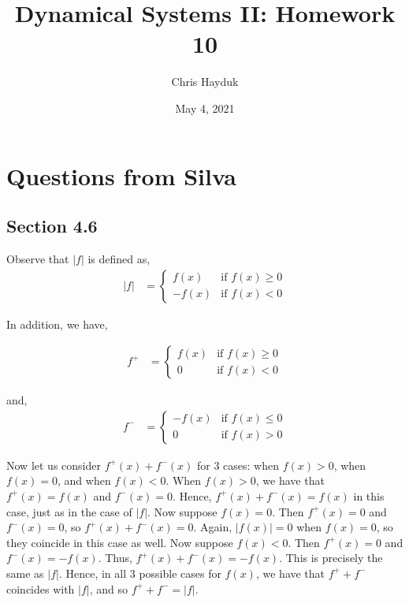 \documentclass[12pt]{article}
\newenvironment{problem}[2][Problem]{\begin{trivlist}
\item[\hskip \labelsep {\bfseries #1}\hskip \labelsep {\bfseries #2.}]}{\end{trivlist}}
\begin{document}
\title{Dynamical Systems II: Homework 10}

\author{Chris Hayduk}
\date{May 4, 2021}

\maketitle

\section{Questions from Silva}

\subsection{Section 4.6}

\begin{problem}{2}
\end{problem}

Observe that $|f|$ is defined as,
\begin{align*}
|f| &= \begin{cases}
f(x) & \text{if } f(x) \geq 0\\
-f(x) & \text{if } f(x) < 0
\end{cases}
\end{align*}

In addition, we have,

\begin{align*}
f^+ &= \begin{cases}
f(x) & \text{if } f(x) \geq 0\\
0 & \text{if } f(x) < 0
\end{cases}
\end{align*}

and,
\begin{align*}
f^- &= \begin{cases}
-f(x) & \text{if } f(x) \leq 0\\
0 & \text{if } f(x) > 0
\end{cases}
\end{align*}

Now let us consider $f^+(x) + f^-(x)$ for 3 cases: when $f(x) > 0$, when $f(x) = 0$, and when $f(x) < 0$. When $f(x) > 0$, we have that $f^+(x) = f(x)$ and $f^-(x) = 0$. Hence, $f^+(x) + f^-(x) = f(x)$ in this case, just as in the case of $|f|$. Now suppose $f(x) = 0$. Then $f^+(x) = 0$ and $f^-(x) = 0$, so $f^+(x) + f^-(x) = 0$. Again, $|f(x)| = 0$ when $f(x) = 0$, so they coincide in this case as well. Now suppose $f(x) < 0$. Then $f^+(x) = 0$ and $f^-(x) = -f(x)$. Thus, $f^+(x) + f^-(x) = -f(x)$. This is precisely the same as $|f|$. Hence, in all 3 possible cases for $f(x)$, we have that $f^+ + f^-$ coincides with $|f|$, and so $f^+ + f^- = |f|$.
\end{document}
